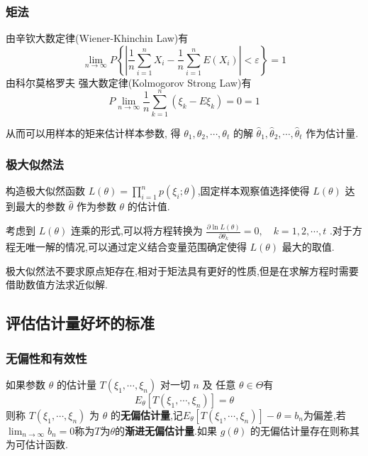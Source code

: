 \documentclass[10pt]{yerbaformat}
\begin{document}
\subsubsection{矩法}
\par 由辛钦大数定律(Wiener-Khinchin Law)有 $$\lim _{n \rightarrow \infty} P\left\{\left|\frac{1}{n} \sum_{i=1}^{n} X_{i}-\frac{1}{n} \sum_{i=1}^{n} E\left(X_{i}\right)\right|<\varepsilon\right\}=1$$ 由科尔莫格罗夫 强大数定律(Kolmogorov Strong Law)有 $$P \lim _{n \rightarrow \infty} \frac{1}{n} \sum_{k=1}^{n}\left(\xi_{k}-E \xi_{k}\right)=0=1$$
\par 从而可以用样本的矩来估计样本参数, 得 $\theta_{1}, \theta_{2}, \cdots, \theta_{t}$ 的解 $\hat{\theta}_{1}, \hat{\theta}_{2}, \cdots, \hat{\theta}_{t}$ 作为估计量.

\subsubsection{极大似然法}
\par 构造极大似然函数 $L(\theta)=\prod_{i=1}^{n} p\left(\xi_{i} ; \theta\right)$,固定样本观察值选择使得 $L(\theta)$ 达到最大的参数 $\hat{\theta}$ 作为参数 $\theta$ 的估计值.

\par 考虑到 $L(\theta)$ 连乘的形式,可以将方程转换为 $\frac{\partial \ln L(\theta)}{\partial \theta_{k}}=0, \quad k=1,2, \cdots, t$ .对于方程无唯一解的情况,可以通过定义结合变量范围确定使得 $L(\theta)$ 最大的取值.

\par 极大似然法不要求原点矩存在,相对于矩法具有更好的性质,但是在求解方程时需要借助数值方法求近似解.

\subsection{评估估计量好坏的标准}
\subsubsection{无偏性和有效性}

\begin{definition}[无偏估计量]
    如果参数 $\theta$ 的估计量 $T\left(\xi_{1}, \cdots, \xi_{n}\right)$ 对一切 $n$ 及 任意 $\theta \in \Theta$有$$E_{\theta}\left[T\left(\xi_{1}, \cdots, \xi_{n}\right)\right]=\theta$$
    则称 $T\left(\xi_{1}, \cdots, \xi_{n}\right)$ 为 $\theta$ 的\textbf{无偏估计量},记$E_{\theta}\left[T\left(\xi_{1}, \cdots, \xi_{n}\right)\right]-\theta=b_{n}$为偏差,若$\lim _{n \rightarrow \infty} b_{n}=0$称为$T$为$\theta$的\textbf{渐进无偏估计量}.如果 $g(\theta)$ 的无偏估计量存在则称其为可估计函数.
\end{definition}
\end{document}
